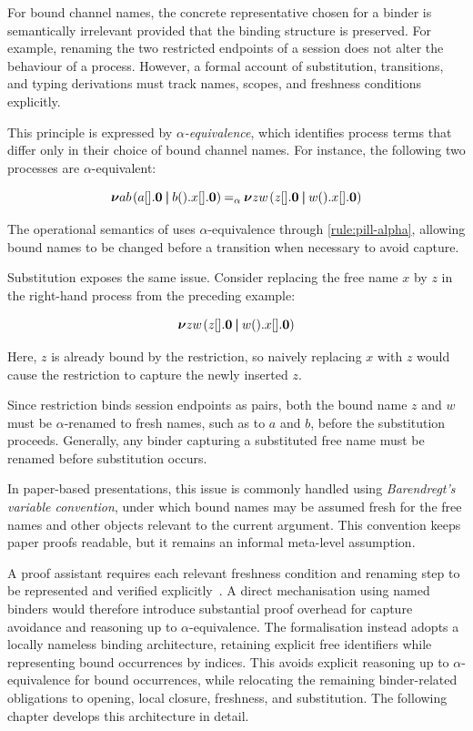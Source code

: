   For bound channel names, the concrete representative chosen for a binder is semantically irrelevant provided that the binding structure is preserved. For example, renaming the two restricted endpoints of a session does not alter the behaviour of a process. However, a formal account of substitution, transitions, and typing derivations must track names, scopes, and freshness conditions explicitly.

  This principle is expressed by \emph{$\alpha$-equivalence}, which identifies process terms that differ only in their choice of bound channel names. For instance, the following two processes are $\alpha$-equivalent:
  \begin{highlight}
  \[
  \phl{\res{ab}{(\send{a}{}{\nil} \pp \recv{b}{}{\send{x}{}{\nil}})}}
  \aleq
  \phl{\res{zw}{(\send{z}{}{\nil} \pp \recv{w}{}{\send{x}{}{\nil}})}}
  \]
  \end{highlight}
  The operational semantics of \pill{} uses $\alpha$-equivalence through \cref{rule:pill-alpha}, allowing bound names to be changed before a transition when necessary to avoid capture.

  Substitution exposes the same issue. Consider replacing the free name $x$ by $z$ in the right-hand process from the preceding example:
  \begin{highlight}
  \[
    {\boldsymbol{\nu}{zw}\mspace{2mu}}{({{z[]}{.}\mathbf{0}} \mathbin{\boldsymbol{|}} {{w()}{.}{{x[]}{.}\mathbf{0}}})} 
  \]
  \end{highlight}
  Here, $z$ is already bound by the restriction, so naively replacing $x$ with $z$ would cause the restriction to capture the newly inserted $z$. 

  Since restriction binds session endpoints as pairs, both the bound name $z$ and $w$ must be $\alpha$-renamed to fresh names, such as to $a$ and $b$, before the substitution proceeds. Generally, any binder capturing a substituted free name must be renamed before substitution occurs. 

  In paper-based presentations, this issue is commonly handled using \emph{Barendregt's variable convention}, under which bound names may be assumed fresh for the free names and other objects relevant to the current argument. This convention keeps paper proofs readable, but it remains an informal meta-level assumption.

  A proof assistant requires each relevant freshness condition and renaming step to be represented and verified explicitly~\citep{A05}. A direct mechanisation using named binders would therefore introduce substantial proof overhead for capture avoidance and reasoning up to $\alpha$-equivalence. The formalisation instead adopts a locally nameless binding architecture, retaining explicit free identifiers while representing bound occurrences by indices. This avoids explicit reasoning up to $\alpha$-equivalence for bound occurrences, while relocating the remaining binder-related obligations to opening, local closure, freshness, and substitution. The following chapter develops this architecture in detail.
